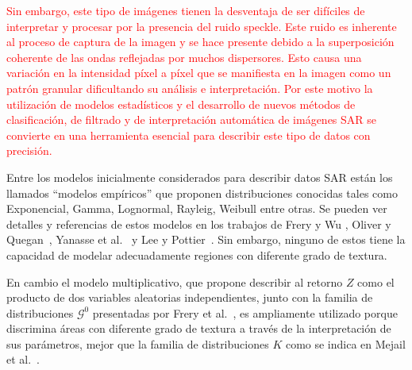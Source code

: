 \documentclass[11pt]{article}
\begin{document}
\textcolor{red}{
Sin embargo, este tipo de imágenes tienen la desventaja de ser difíciles de interpretar y procesar por la presencia del ruido speckle. Este ruido es inherente al proceso de captura de la imagen y se hace presente debido a la superposición coherente de las ondas reflejadas por muchos dispersores. Esto causa una variación en la intensidad píxel a píxel que se manifiesta en la imagen como un patrón granular dificultando su análisis e interpretación. Por este motivo la utilización de modelos estadísticos y el desarrollo de nuevos métodos de clasificación, de filtrado y de interpretación automática de imágenes SAR se convierte en una herramienta esencial para describir este tipo de datos con precisión.}

Entre los modelos inicialmente considerados para describir datos SAR están los llamados ``modelos empíricos'' que proponen distribuciones conocidas tales como Exponencial, Gamma, Lognormal, Rayleig, Weibull entre otras. Se pueden ver detalles y referencias de estos modelos en los trabajos de Frery y Wu \cite{FreryLibro2019}, Oliver y Quegan~\cite{oliverquegan98}, Yanasse et al.~\cite{Yanasse93} y Lee y Pottier~\cite{Lee2009}. 
Sin embargo, ninguno de estos tiene la capacidad de modelar adecuadamente regiones con diferente grado de textura.
%

En cambio el modelo multiplicativo, que propone describir al retorno $Z$ como el producto de dos variables aleatorias independientes, junto con la familia de distribuciones $\mathcal{G}^0$ presentadas por Frery et al.~\cite{Frery97}, es ampliamente utilizado porque discrimina áreas con diferente grado de textura a través de la interpretación de sus parámetros, mejor que la familia de distribuciones $K$ como se indica en Mejail et al.~\cite{MejailJacoboFreryBustos:IJRS}.

\end{document}
